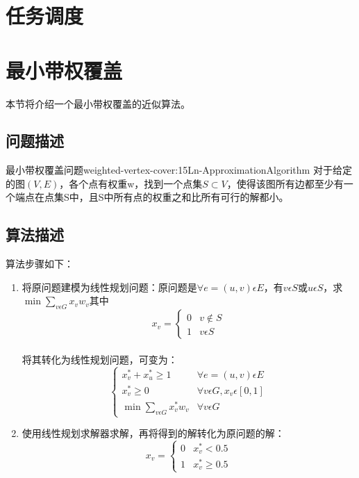 \section{任务调度}

\section{最小带权覆盖}

本节将介绍一个最小带权覆盖的近似算法。

\subsection{问题描述}

\begin{definition}{最小带权覆盖问题}{weighted-vertex-cover:15Ln-ApproximationAlgorithm}
	对于给定的图$(V,E)$，各个点有权重w，找到一个点集$S\subset V$，使得该图所有边都至少有一个端点在点集S中，且S中所有点的权重之和比所有可行的解都小。
\end{definition}

\subsection{算法描述}

算法步骤如下：
\begin{enumerate}
	\item 将原问题建模为线性规划问题：原问题是$\forall e=(u,v)\epsilon E$，有$v\epsilon S$或$u\epsilon S$，求$\min \sum_{v\epsilon G} x_vw_v$其中
	\[
		x_v = \begin{cases}
			0 & v\notin S \\
			1 & v\epsilon S
		\end{cases}
	\]\\
	将其转化为线性规划问题，可变为：
	\[
		\begin{cases}
			x_v^*+x_u^*\geqslant 1 			   &\forall e=(u,v)\epsilon E\\
			x_v^*\geqslant 0	   			   &\forall v\epsilon G, x_v\epsilon [0,1]\\
			\min \sum_{v\epsilon G} x_v^*w_v &\forall v\epsilon G\
		\end{cases}
	\]
	\item 使用线性规划求解器求解，再将得到的解转化为原问题的解：
	\[
		x_v=\begin{cases}
			0 &x_v^*<0.5\\
			1 &x_v^*\geqslant 0.5
		\end{cases}
	\]
\end{enumerate}

